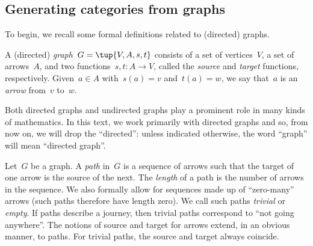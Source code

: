 %
%
%


\subsection{Generating categories from graphs}
\label{sec:catsfromgraphs}
To begin, we recall some formal definitions related to (directed) graphs. 


\begin{definition}[Graph]
A (directed) \emph{graph}~$G=\tup{V,A,s,t}$ consists of a set of vertices~$V$, a set of arrows~$A$, and two functions~$s,t\colon A\to V$, called the \emph{source} and \emph{target} functions, respectively. Given~$a\in A$ with~$s(a)=v$ and~$t(a)=w$, we say that~$a$ is an \emph{arrow} from~$v$ to~$w$. 
\end{definition}

\begin{remark}
Both directed graphs and undirected graphs play a prominent role in many kinds of mathematics. In this text, we work primarily with directed graphs and so, from now on, we will drop the ``directed'': unless indicated otherwise, the word ``graph'' will mean ``directed graph''. 
\end{remark}

\begin{definition}[Paths]
Let~$G$ be a graph. A \emph{path} in~$G$ is a sequence of arrows such that the target of one arrow is the source of the next. The \emph{length} of a path is the number of arrows in the sequence. We also formally allow for sequences made up of ``zero-many'' arrows (such paths therefore have length zero). We call such paths \emph{trivial} or \emph{empty}. If paths describe a journey, then trivial paths correspond to ``not going anywhere''.  The notions of source and target for arrows extend, in an obvious manner, to paths. For trivial paths, the source and target always coincide. 
\end{definition}

